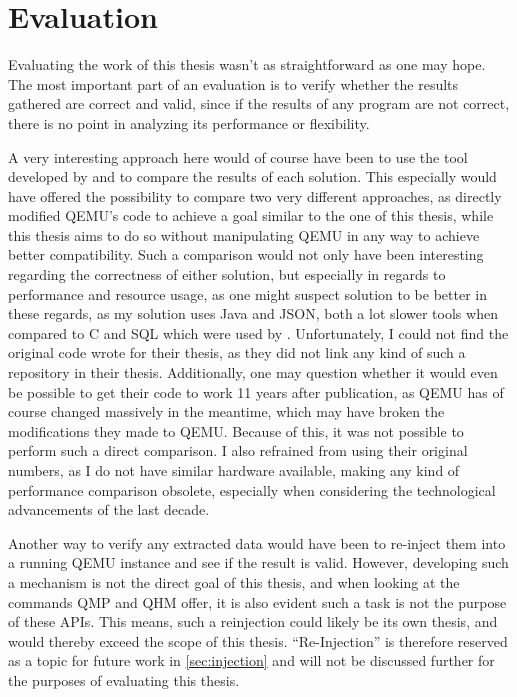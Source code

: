 
\chapter{Evaluation}\label{chap:Evaluation}
Evaluating the work of this thesis wasn't as straightforward as one may hope.
The most important part of an evaluation is to verify whether the results gathered are correct and valid,
since if the results of any program are not correct, there is no point in analyzing its performance or flexibility.

A very interesting approach here would of course have been to use the tool developed by \citeauthor{kitcheckpoints}
and to compare the results of each solution.
This especially would have offered the possibility to compare two very different approaches,
as \citeauthor{kitcheckpoints} directly modified QEMU's code to achieve a goal similar to the one of this thesis,
while this thesis aims to do so without manipulating QEMU in any way to achieve better compatibility.
Such a comparison would not only have been interesting regarding the correctness of either solution,
but especially in regards to performance and resource usage,
as one might suspect \citeauthor{kitcheckpoints} solution to be better in these regards,
as my solution uses Java and JSON, both a lot slower tools when compared to C and SQL which were used by \citeauthor{kitcheckpoints}.
Unfortunately, I could not find the original code \citeauthor{kitcheckpoints} wrote for their thesis,
as they did not link any kind of such a repository in their thesis.
Additionally, one may question whether it would even be possible to get their code to work 11 years after publication,
as QEMU has of course changed massively in the meantime, which may have broken the modifications they made to QEMU.
Because of this, it was not possible to perform such a direct comparison.
I also refrained from using their original numbers,
as I do not have similar hardware available,
making any kind of performance comparison obsolete,
especially when considering the technological advancements of the last decade\cite{kitcheckpoints}.

Another way to verify any extracted data would have been to re-inject them into a running QEMU instance and see if the result is valid.
However, developing such a mechanism is not the direct goal of this thesis,
and when looking at the commands QMP and QHM offer, it is also evident such a task is not the purpose of these APIs.
This means, such a reinjection could likely be its own thesis,
and would thereby exceed the scope of this thesis.
\enquote{Re-Injection} is therefore reserved as a topic for future work in \autoref{sec:injection}
and will not be discussed further for the purposes of evaluating this thesis.

